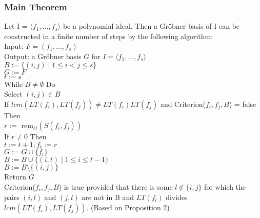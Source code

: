 \documentclass{beamer}
\begin{document}
\begin{frame}
\frametitle{Main Theorem}
\begin{footnotesize}

Let I = $\langle f_1, ..., f_s\rangle$ be a polynomial ideal. Then a Gr{\"o}bner basis of I can be constructed in a finite number of steps by the following algorithm: 
\\Input: $F = (f_1, ..., f_s)$
\\Output: a Gr{\"o}bner basis $G$ for $I = \langle f_1, ..., f_s\rangle$
\vspace{2mm}
\\$B := \{(i,j)\mid 1\leq i < j\leq s\}$
\\$G:= F$
\\$t := s$
\\While $B\neq \emptyset$ Do
\\\hspace{6mm} Select $(i,j)\in B$
\\\hspace{6mm} If $lcm(LT(f_i),LT(f_j)) \neq LT(f_i)LT(f_j)$ and Criterion($f_i,f_j,B$) = false Then
\\\hspace{12mm} $r :=$ rem$_{G}(S(f_i,f_j))$
\\\hspace{12mm} If $r\neq 0$ Then 
\\\hspace{18mm} $t := t+1; f_t := r$
\\\hspace{18mm} $G := G \cup \{f_t \}$
\\\hspace{18mm} $B := B \cup \{(i,t)\mid1\leq i \leq t-1\}$
\\\hspace{6mm} $B := B\setminus \{(i,j)\}$
\\Return $G$
\\\vspace{2mm} Criterion($f_i,f_j,B$) is true provided that there is some $l\notin \{i,j\}$ for which the pairs $(i,l)$ and $(j,l)$ are not in B and $LT(f_l)$ divides $lcm(LT(f_i),LT(f_j))$. (Based on Proposition 2) 


\end{footnotesize}
\end{frame}


\end{document}
